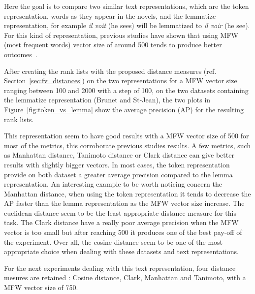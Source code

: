Here the goal is to compare two similar text representations, which are the token representation, words as they appear in the novels, and the lemmatize representation, for example \textit{il voit} (he sees) will be lemmatized to \textit{il voir} (he see).
For this kind of representation, previous studies have shown that using MFW (most frequent words) vector size of around 500 tends to produce better outcomes~\cite{savoy_text_representation}.

After creating the rank lists with the proposed distance measures (ref. Section~\ref{sec:fv_distances}) on the two representations for a MFW vector size ranging between 100 and 2000 with a step of 100, on the two datasets containing the lemmatize representation (Brunet and St-Jean), the two plots in Figure~\ref{fig:token_vs_lemma} show the average precision (AP) for the resulting rank lists.

This representation seem to have good results with a MFW vector size of 500 for most of the metrics, this corroborate previous studies results.
A few metrics, such as Manhattan distance, Tanimoto distance or Clark distance can give better results with slightly bigger vectors.
In most cases, the token representation provide on both dataset a greater average precision compared to the lemma representation.
An interesting example to be worth noticing concern the Manhattan distance, when using the token representation it tends to decrease the AP faster than the lemma representation as the MFW vector size increase.
The euclidean distance seem to be the least appropriate distance measure for this task.
The Clark distance have a really poor average precision when the MFW vector is too small but after reaching 500 it produces one of the best pay-off of the experiment.
Over all, the cosine distance seem to be one of the most appropriate choice when dealing with these datasets and text representations.

For the next experiments dealing with this text representation, four distance mesures are retained : Cosine distance, Clark, Manhattan and Tanimoto, with a MFW vector size of 750.

